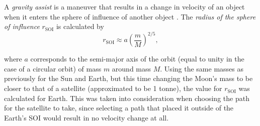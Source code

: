 \documentclass[11pt, english]{report}
\begin{document}
\normalsize{\noindent A \emph{gravity assist} is a maneuver that results in a change in velocity of an object when it enters the sphere of influence of another object \cite{noauthor_basics_nodate}. The \emph{radius of the sphere of influence} $r_{\mathrm{SOI}}$  \cite{noauthor_sphere_nodate} is calculated by
\begin{equation}
    r_{\mathrm{SOI}} \approx a\left( \frac{m}{M} \right)^{2/5},
\end{equation}

\noindent where $a$ corresponds to the semi-major axis of the orbit (equal to unity in the case of a circular orbit) of mass $m$ around mass $M$. Using the same masses as previously for the Sun and Earth, but this time changing the Moon's mass to be closer to that of a satellite (approximated to be 1 tonne), the value for $r_{\mathrm{SOI}}$ was calculated for Earth. This was taken into consideration when choosing the path for the satellite to take, since selecting a path that placed it outside of the Earth's SOI would result in no velocity change at all. 

}
\end{document}
